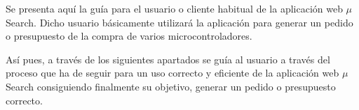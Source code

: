 Se presenta aquí la guía para el usuario o cliente habitual de la aplicación web $\mu$Search. Dicho usuario básicamente utilizará la aplicación para generar un pedido o presupuesto de la compra de varios microcontroladores.

Así pues, a través de los siguientes apartados se guía al usuario a través del proceso que ha de seguir para un uso correcto y eficiente de la aplicación web $\mu$Search consiguiendo finalmente su objetivo, generar un pedido o presupuesto correcto.